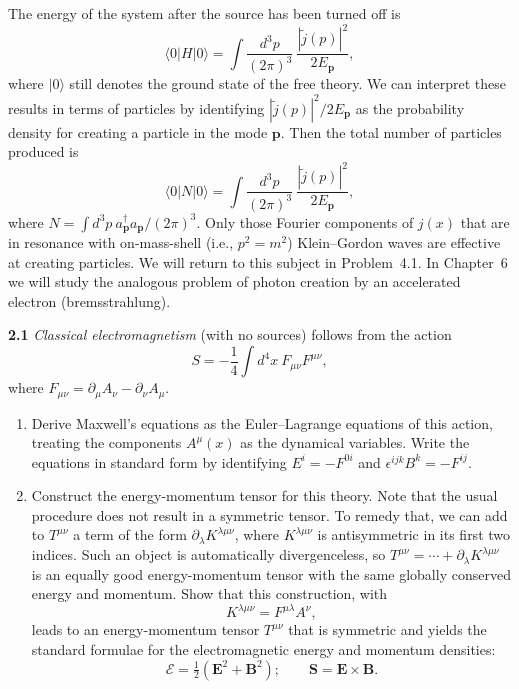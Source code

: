 The energy of the system after the source has been turned off is
\begin{equation}
  \langle 0|H|0\rangle = \int \frac{d^3p}{(2\pi)^3}\
    \frac{|\tilde{j}(p)|^2}{2E_{\mathbf{p}}},
  \label{eq:2.65}
\end{equation}
where $|0\rangle$ still denotes the ground state of the free theory.  We
can interpret these results in terms of particles by identifying
$|\tilde{j}(p)|^2/2E_{\mathbf{p}}$ as the probability density for creating
a particle in the mode $\mathbf{p}$.  Then the total number of particles
produced is
\begin{equation}
  \langle 0|N|0\rangle = \int \frac{d^3p}{(2\pi)^3}\
    \frac{|\tilde{j}(p)|^2}{2E_{\mathbf{p}}},
  \label{eq:2.66}
\end{equation}
where $N = \int d^3p\ a_{\mathbf{p}}^\dagger a_{\mathbf{p}}/(2\pi)^3$.
Only those Fourier components of $j(x)$ that are in resonance with
on-mass-shell (i.e., $p^2=m^2$) Klein--Gordon waves are effective at
creating particles.  We will return to this subject in Problem~4.1.  In
Chapter~6 we will study the analogous problem of photon creation by an
accelerated electron (bremsstrahlung).

\problems

\textbf{2.1} \emph{Classical electromagnetism} (with no sources) follows
from the action
\begin{equation}
  S = -\frac{1}{4}\int d^4x\ F_{\mu\nu}F^{\mu\nu},
\end{equation}
where $F_{\mu\nu} = \partial_\mu A_\nu - \partial_\nu A_\mu$.
\begin{enumerate}[label=(\alph*)]
  \item Derive Maxwell's equations as the Euler--Lagrange equations of
    this action, treating the components $A^\mu(x)$ as the dynamical
    variables.  Write the equations in standard form by identifying
    $E^i = -F^{0i}$ and $\epsilon^{ijk}B^k = -F^{ij}$.
  \item Construct the energy-momentum tensor for this theory.  Note that
    the usual procedure does not result in a symmetric tensor.  To remedy
    that, we can add to $T^{\mu\nu}$ a term of the form
    $\partial_\lambda K^{\lambda\mu\nu}$, where $K^{\lambda\mu\nu}$ is
    antisymmetric in its first two indices.  Such an object is
    automatically divergenceless, so $T^{\mu\nu} = \cdots + \partial_\lambda
    K^{\lambda\mu\nu}$ is an equally good energy-momentum tensor with the
    same globally conserved energy and momentum.  Show that this
    construction, with
    \begin{equation}
      K^{\lambda\mu\nu} = F^{\mu\lambda}A^\nu,
    \end{equation}
    leads to an energy-momentum tensor $T^{\mu\nu}$ that is symmetric and
    yields the standard formulae for the electromagnetic energy and
    momentum densities:
    \begin{equation}
      \mathcal{E} = \tfrac{1}{2}(\mathbf{E}^2+\mathbf{B}^2);\qquad
      \mathbf{S} = \mathbf{E}\times\mathbf{B}.
    \end{equation}
\end{enumerate}

